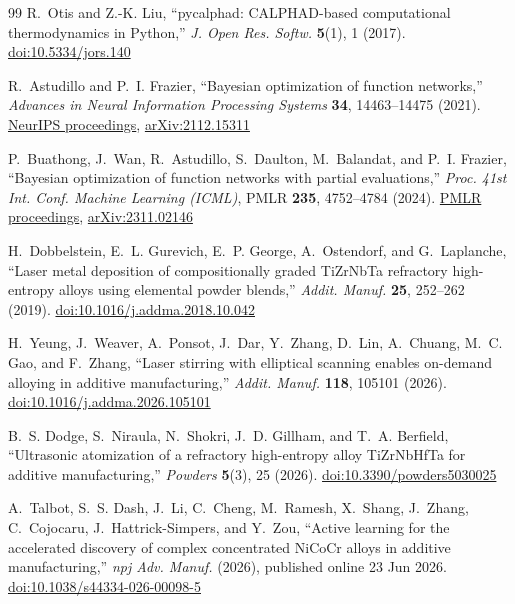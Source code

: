 \documentclass[12pt,letterpaper]{article}
\begin{document}
\begin{thebibliography}{99}
R.~Otis and Z.-K. Liu, ``pycalphad: CALPHAD-based computational thermodynamics
in Python,'' \emph{J. Open Res. Softw.} \textbf{5}(1), 1 (2017).
\href{https://doi.org/10.5334/jors.140}{doi:10.5334/jors.140}

R.~Astudillo and P.~I. Frazier, ``Bayesian optimization of function networks,''
\emph{Advances in Neural Information Processing Systems} \textbf{34},
14463--14475 (2021).
\href{https://proceedings.neurips.cc/paper_files/paper/2021/hash/792c7b5aae4a79e78aaeda80516ae2ac-Abstract.html}{NeurIPS proceedings},
\href{https://arxiv.org/abs/2112.15311}{arXiv:2112.15311}

P.~Buathong, J.~Wan, R.~Astudillo, S.~Daulton, M.~Balandat, and P.~I. Frazier,
``Bayesian optimization of function networks with partial evaluations,''
\emph{Proc. 41st Int. Conf. Machine Learning (ICML)}, PMLR \textbf{235},
4752--4784 (2024).
\href{https://proceedings.mlr.press/v235/buathong24a.html}{PMLR proceedings},
\href{https://arxiv.org/abs/2311.02146}{arXiv:2311.02146}

H.~Dobbelstein, E.~L. Gurevich, E.~P. George, A.~Ostendorf, and
G.~Laplanche, ``Laser metal deposition of compositionally graded TiZrNbTa
refractory high-entropy alloys using elemental powder blends,''
\emph{Addit. Manuf.} \textbf{25}, 252--262 (2019).
\href{https://doi.org/10.1016/j.addma.2018.10.042}{doi:10.1016/j.addma.2018.10.042}

H.~Yeung, J.~Weaver, A.~Ponsot, J.~Dar, Y.~Zhang, D.~Lin, A.~Chuang,
M.~C. Gao, and F.~Zhang, ``Laser stirring with elliptical scanning enables
on-demand alloying in additive manufacturing,'' \emph{Addit. Manuf.}
\textbf{118}, 105101 (2026).
\href{https://doi.org/10.1016/j.addma.2026.105101}{doi:10.1016/j.addma.2026.105101}

B.~S. Dodge, S.~Niraula, N.~Shokri, J.~D. Gillham, and T.~A. Berfield,
``Ultrasonic atomization of a refractory high-entropy alloy TiZrNbHfTa for
additive manufacturing,'' \emph{Powders} \textbf{5}(3), 25 (2026).
\href{https://doi.org/10.3390/powders5030025}{doi:10.3390/powders5030025}

A.~Talbot, S.~S. Dash, J.~Li, C.~Cheng, M.~Ramesh, X.~Shang, J.~Zhang,
C.~Cojocaru, J.~Hattrick-Simpers, and Y.~Zou, ``Active learning for the
accelerated discovery of complex concentrated NiCoCr alloys in additive
manufacturing,'' \emph{npj Adv. Manuf.} (2026), published online 23 Jun 2026.
\href{https://doi.org/10.1038/s44334-026-00098-5}{doi:10.1038/s44334-026-00098-5}

\end{thebibliography}

\end{document}
